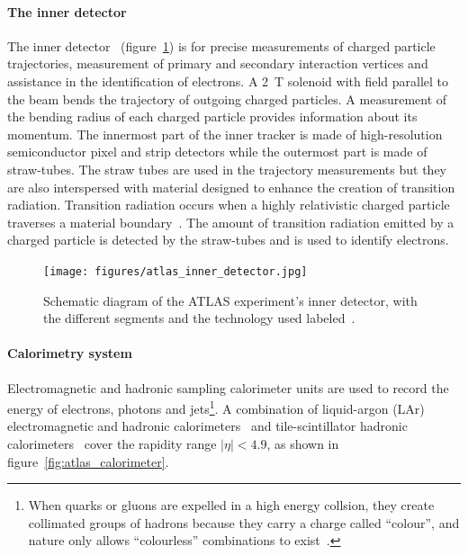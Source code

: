 \paragraph*{The inner detector} \hfill \break
The inner detector~\cite{atlas_inner_detector_tdr_1, atlas_inner_detector_tdr_2} (figure~\ref{fig:atlas_inner_detector}) is for precise measurements of charged particle trajectories, measurement of primary and secondary interaction vertices and assistance in the identification of electrons. A \SI{2}{\tesla} solenoid with field parallel to the beam bends the trajectory of outgoing charged particles. A measurement of the bending radius of each charged particle provides information about its momentum. The innermost part of the inner tracker is made of high-resolution semiconductor pixel and strip detectors while the outermost part is made of straw-tubes. The straw tubes are used in the trajectory measurements but they are also interspersed with material designed to enhance the creation of transition radiation. Transition radiation occurs when a highly relativistic charged particle traverses a material boundary~\cite{grupen_particle_2008}. The amount of transition radiation emitted by a charged particle is detected by the straw-tubes and is used to identify electrons. 

\begin{figure}
    \centering
    \texttt{[image: figures/atlas\_inner\_detector.jpg]}
    \caption{Schematic diagram of the ATLAS experiment's inner detector, with the different segments and the technology used labeled~\cite{collaboration_atlas_2008}.}
    \label{fig:atlas_inner_detector}
\end{figure}

\paragraph*{Calorimetry system} \hfill \break
Electromagnetic and hadronic sampling calorimeter units are used to record the energy of electrons, photons and jets\footnote{When quarks or gluons are expelled in a high energy collsion, they create collimated groups of hadrons because they carry a charge called ``colour'', and nature only allows ``colourless'' combinations to exist~\cite{grupen_particle_2008}.}. A combination of liquid-argon (LAr) electromagnetic and hadronic calorimeters~\cite{atlas_lar_cal_tdr} and tile-scintillator hadronic calorimeters~\cite{atlas_tile_cal_tdr} cover the rapidity range $|\eta| < 4.9$, as shown in figure~\ref{fig:atlas_calorimeter}.

